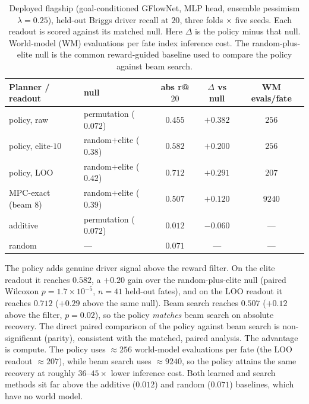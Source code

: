 \begin{table}[h]\centering\footnotesize
\caption{Deployed flagship (goal-conditioned GFlowNet, MLP head, ensemble pessimism
$\lambda{=}0.25$), held-out Briggs driver recall at $20$, three folds $\times$ five seeds.
Each readout is scored against its matched null. Here $\Delta$ is the policy minus that null.
World-model (WM) evaluations per fate index inference cost. The random-plus-elite null is the
common reward-guided baseline used to compare the policy against beam search.}
\label{tab:flagship_rec}
\begin{tabular}{@{}llccc@{}}
\toprule
Planner / readout & null & abs r@$20$ & $\Delta$ vs null & WM evals/fate \\
\midrule
policy, raw            & permutation ($0.072$)   & $0.455$ & $+0.382$ & $256$ \\
policy, elite-$10$     & random$+$elite ($0.38$) & $0.582$ & $+0.200$ & $256$ \\
policy, LOO            & random$+$elite ($0.42$) & $0.712$ & $+0.291$ & $207$ \\
MPC-exact (beam $8$)   & random$+$elite ($0.39$) & $0.507$ & $+0.120$ & $9240$ \\
additive               & permutation ($0.072$)   & $0.012$ & $-0.060$ & --- \\
random                 & ---                     & $0.071$ & ---      & --- \\
\bottomrule
\end{tabular}
\end{table}

The policy adds genuine driver signal above the reward filter. On the elite readout it
reaches $0.582$, a $+0.20$ gain over the random-plus-elite null (paired Wilcoxon
$p{=}1.7\times10^{-5}$, $n{=}41$ held-out fates), and on the LOO readout it reaches $0.712$
($+0.29$ above the same null). Beam search reaches $0.507$ ($+0.12$ above the filter,
$p{=}0.02$), so the policy \emph{matches} beam search on absolute recovery. The direct paired
comparison of the policy against beam search is non-significant (parity), consistent with the
matched, paired analysis. The advantage is compute. The policy uses $\approx256$ world-model
evaluations per fate (the LOO readout $\approx207$), while beam search uses $\approx9240$, so
the policy attains the same recovery at roughly $36$--$45\times$ lower inference cost. Both
learned and search methods sit far above the additive ($0.012$) and random ($0.071$)
baselines, which have no world model.

